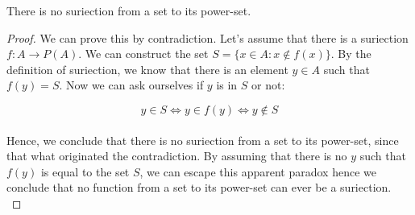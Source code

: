 \begin{theorem}
\label{thm:Cantor}
    There is no suriection from a set to its power-set.
\end{theorem}
\begin{proof}
    We can prove this by contradiction. Let's assume that there is a suriection $f : A \rightarrow P(A)$.
    We can construct the set $S = \{ x \in A : x \notin f(x) \}$. By the definition of suriection, we know that 
    there is an element $y \in A$ such that $f(y) = S$. Now we can ask ourselves if $y$ is in $S$ or not:

    $$  y \in S \iff y \in f(y) \iff y \notin S  $$ \\

    Hence, we conclude that there is no suriection from a set to its power-set, since 
    that what originated the contradiction. By assuming that there is no $y$ such that $f(y)$ is 
    equal to the set $S$, we can escape this apparent paradox hence we conclude that no function 
    from a set to its power-set can ever be a suriection. \\
\end{proof}

